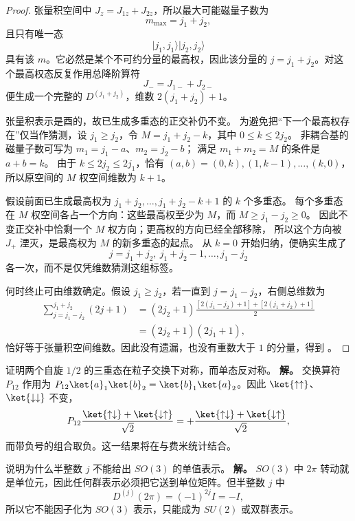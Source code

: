 \begin{proof}
张量积空间中 $J_z=J_{1z}+J_{2z}$，所以最大可能磁量子数为
\[
m_{\max}=j_1+j_2,
\]
且只有唯一态
\[
\lvert j_1,j_1\rangle\lvert j_2,j_2\rangle
\]
具有该 $m$。它必然是某个不可约分量的最高权，因此该分量的 $j=j_1+j_2$。对这个最高权态反复作用总降阶算符
\[
J_-=J_{1-}+J_{2-}
\]
便生成一个完整的 $D^{(j_1+j_2)}$，维数 $2(j_1+j_2)+1$。




张量积表示是酉的，故已生成多重态的正交补仍不变。
为避免把“下一个最高权存在”仅当作猜测，设 $j_1\ge j_2$，令
$M=j_1+j_2-k$，其中 $0\le k\le2j_2$。
非耦合基的磁量子数可写为 $m_1=j_1-a$、$m_2=j_2-b$；
满足 $m_1+m_2=M$ 的条件是 $a+b=k$。
由于 $k\le2j_2\le2j_1$，恰有 $(a,b)=(0,k),(1,k-1),\dots,(k,0)$，
所以原空间的 $M$ 权空间维数为 $k+1$。

假设前面已生成最高权为 $j_1+j_2,\dots,j_1+j_2-k+1$ 的 $k$ 个多重态。
每个多重态在 $M$ 权空间各占一个方向：这些最高权至少为 $M$，而 $M\ge j_1-j_2\ge0$。
因此不变正交补中恰剩一个 $M$ 权方向；更高权的方向已经全部移除，
所以这个方向被 $J_+$ 湮灭，是最高权为 $M$ 的新多重态的起点。
从 $k=0$ 开始归纳，便确实生成了
\[
j=j_1+j_2,\ j_1+j_2-1,\dots,j_1-j_2
\]
各一次，而不是仅凭维数猜测这组标签。

何时终止可由维数确定。假设 $j_1\ge j_2$，若一直到 $j=j_1-j_2$，右侧总维数为
\begin{align*}
\sum_{j=j_1-j_2}^{j_1+j_2}(2j+1)
&=(2j_2+1)\frac{[2(j_1-j_2)+1]+[2(j_1+j_2)+1]}2\\
&=(2j_2+1)(2j_1+1),
\end{align*}
恰好等于张量积空间维数。因此没有遗漏，也没有重数大于 $1$ 的分量，得到 。
\end{proof}

\begin{workedexample}
证明两个自旋 $1/2$ 的三重态在粒子交换下对称，而单态反对称。
\textbf{解。} 交换算符 $P_{12}$ 作用为 $P_{12}\ket{a}_1\ket{b}_2=\ket{b}_1\ket{a}_2$。因此 $\ket{\uparrow\uparrow}$、$\ket{\downarrow\downarrow}$ 不变，
\[
P_{12}\frac{\ket{\uparrow\downarrow}+\ket{\downarrow\uparrow}}{\sqrt2}
=+\frac{\ket{\uparrow\downarrow}+\ket{\downarrow\uparrow}}{\sqrt2},
\]
而带负号的组合取负。这一结果将在与费米统计结合。
\end{workedexample}


\begin{workedexample}
说明为什么半整数 $j$ 不能给出 $SO(3)$ 的单值表示。
\textbf{解。} $SO(3)$ 中 $2\pi$ 转动就是单位元，因此任何群表示必须把它送到单位矩阵。但半整数 $j$ 中
\[
D^{(j)}(2\pi)=(-1)^{2j}I=-I,
\]
所以它不能因子化为 $SO(3)$ 表示，只能成为 $SU(2)$ 或双群表示。
\end{workedexample}



